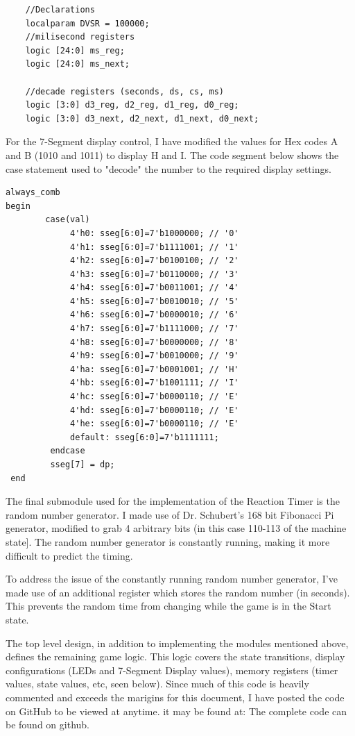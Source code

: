 \documentclass{article}
\begin{document}
\begin{lstlisting}
    //Declarations
    localparam DVSR = 100000;
    //milisecond registers
    logic [24:0] ms_reg;
    logic [24:0] ms_next;
    
    //decade registers (seconds, ds, cs, ms)
    logic [3:0] d3_reg, d2_reg, d1_reg, d0_reg;
    logic [3:0] d3_next, d2_next, d1_next, d0_next;
\end{lstlisting}

For the 7-Segment display control, I have modified the values for Hex codes A and B (1010 and 1011) to display H and I. The code segment below shows the case statement used to "decode" the number to the required display settings.

\begin{lstlisting}
always_comb
begin
        case(val)
             4'h0: sseg[6:0]=7'b1000000; // '0'
             4'h1: sseg[6:0]=7'b1111001; // '1'
             4'h2: sseg[6:0]=7'b0100100; // '2'
             4'h3: sseg[6:0]=7'b0110000; // '3'
             4'h4: sseg[6:0]=7'b0011001; // '4'
             4'h5: sseg[6:0]=7'b0010010; // '5'
             4'h6: sseg[6:0]=7'b0000010; // '6'
             4'h7: sseg[6:0]=7'b1111000; // '7'
             4'h8: sseg[6:0]=7'b0000000; // '8'
             4'h9: sseg[6:0]=7'b0010000; // '9'
             4'ha: sseg[6:0]=7'b0001001; // 'H'
             4'hb: sseg[6:0]=7'b1001111; // 'I' 
             4'hc: sseg[6:0]=7'b0000110; // 'E' 
             4'hd: sseg[6:0]=7'b0000110; // 'E' 
             4'he: sseg[6:0]=7'b0000110; // 'E' 
             default: sseg[6:0]=7'b1111111; 
         endcase
         sseg[7] = dp;
 end
\end{lstlisting}

The final submodule used for the implementation of the Reaction Timer is the random number generator. I made use of Dr. Schubert's 168 bit Fibonacci Pi generator, modified to grab 4 arbitrary bits (in this case 110-113 of the machine state]. The random number generator is constantly running, making it more difficult to predict the timing.


\smallskip
To address the issue of the constantly running random number generator, I've made use of an additional register which stores the random number (in seconds). This prevents the random time from changing while the game is in the Start state.


\smallskip
The top level design, in addition to implementing the modules mentioned above, defines the remaining game logic. This logic covers the state transitions, display configurations (LEDs and 7-Segment Display values), memory registers (timer values, state values, etc, seen below).  Since much of this code is heavily commented and exceeds the marigins for this document, I have posted the code on GitHub to be viewed at anytime. it may be found at: The complete code can be found on github.
\end{document}
